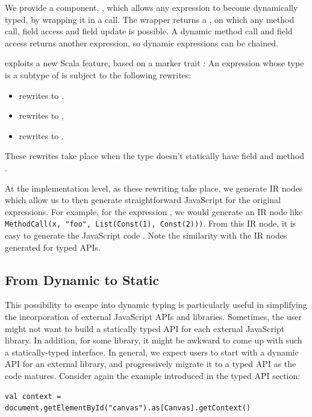 \documentclass[runningheads,a4paper]{llncs}
\begin{document}
We provide a component, , which allows any expression to become
dynamically typed, by wrapping it in a  call. The
 wrapper returns a , on which any
method call, field access and field update is possible. A dynamic
method call and field access returns another 
expression, so dynamic expressions can be chained.

 exploits a new Scala feature, based on a
marker trait : An expression whose type  is a
subtype of  is subject to the following rewrites:
\begin{itemize}
\item {} rewrites to ,
\item {} rewrites to ,
\item {} rewrites to .
\end{itemize}
These rewrites take place when the type  doesn't statically
have field  and method .

At the implementation level, as these rewriting take place, we
generate IR nodes which allow us to then generate straightforward
JavaScript for the original expressions. For example, for the
expression , we would generate an IR node
like {\tt\small MethodCall(x, "foo", List(Const(1), Const(2)))}. From this
IR node, it is easy to generate the JavaScript code . Note the similarity with the IR nodes generated for typed APIs.

\subsection{From Dynamic to Static}

This possibility to escape into dynamic typing is particularly useful
in simplifying the incorporation of external JavaScript APIs and
libraries. Sometimes, the user might not want to build a statically
typed API for each external JavaScript library. In addition, for
some library, it might be awkward to come up with such a statically-typed
interface. In general, we expect users to start with a dynamic API for
an external library, and progressively migrate it to a typed API as
the code matures. Consider again the example introduced in the typed
API section:
\begin{lstlisting}
val context = document.getElementById("canvas").as[Canvas].getContext()
\end{lstlisting}
\end{document}
